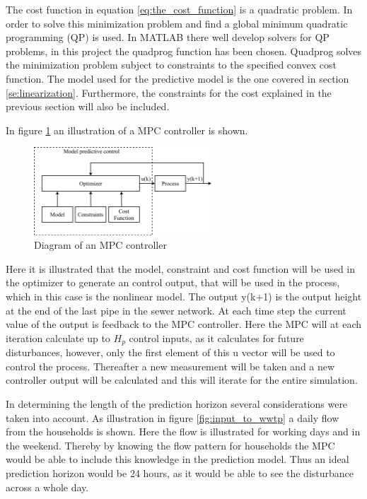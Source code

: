 The cost function in equation \ref{eq:the_cost_function} is a quadratic problem. In order to solve this minimization problem and find a global minimum quadratic programming (QP) is used. In MATLAB there well develop solvers for QP problems, in this project the quadprog function has been chosen. Quadprog solves the minimization problem subject to constraints to the specified convex cost function. The model used for the predictive model is the one covered in section \ref{se:linearization}. Furthermore, the constraints for the cost explained in the previous section will also be included. 

In figure \ref{fig:mpc_diagram} an illustration of a MPC controller is shown.
\begin{figure}[H]
	\centering
	\includegraphics[width=0.60\textwidth]{report/control/pictures/mpc_diagram}
	\caption{Diagram of an MPC controller}
	\label{fig:mpc_diagram}
\end{figure}

Here it is illustrated that the model, constraint and cost function will be used in the optimizer to generate an control output, that will be used in the process, which in this case is the nonlinear model. The output y(k+1) is the output height at the end of the last pipe in the sewer network. At each time step the current value of the output is feedback to the MPC controller. Here the MPC will at each iteration calculate up to $H_p$ control inputs, as it calculates for future disturbances, however, only the first element of this u vector will be used to control the process. Thereafter a new measurement will be taken and a new controller output will be calculated and this will iterate for the entire simulation.

In determining the length of the prediction horizon several considerations were taken into account. As illustration in figure \ref{fig:input_to_wwtp} a daily flow from the households is shown. Here the flow is illustrated for working days and in the weekend. Thereby by knowing the flow pattern for households the MPC would be able to include this knowledge in the prediction model. Thus an ideal prediction horizon would be 24 hours, as it would be able to see the disturbance across a whole day. 

